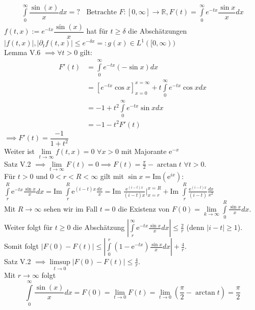  \begin{example}
    \begin{align*}
      \int\limits_0^{\infty} \dfrac{\sin(x)}{x} dx = ? \ \ \ \ \text{Betrachte $F: [0, \infty] \to \mathbb{R}, F(t) = \int\limits_0^{\infty} e^{-tx} \dfrac{\sin{x}}{x} dx$}
    \end{align*}
    $f(t,x) := e^{-tx} \dfrac{\sin(x)}{x}$ hat für $t \geq \delta$ die Abschätzungen\\
    $|f(t,x)|, |\partial_t f(t,x)| \leq e^{-\delta x} =: g(x) \in L^1([0, \infty))$\\
    Lemma V.6 $\implies \forall t > 0$ gilt: 
    \begin{align*}
      F'(t) &= \int\limits_0^{\infty} e^{-tx} (-\sin{x}) dx\\
            &= [e^{-tx} \cos{x}]_{x=0}^{x=\infty} + t \int\limits_0^{\infty} e^{-tx} \cos{x} dx\\
            &= -1 + t^2 \int\limits_0^{\infty} e^{-tx} \sin{x} dx\\
            &= -1 - t^2 F'(t)
    \end{align*}
    $\implies F'(t) = \dfrac{-1}{1+t^2}$\\
    Weiter ist $\lim\limits_{t\to\infty} f(t,x) = 0$ $\forall x>0$ mit Majorante $\text{e}^{-x}$  \\
    Satz V.2 $\implies \lim\limits_{t\to\infty} F(t) = 0 \implies F(t) = \frac{\pi}{2}-\arctan{t}$ $\forall t>0$. \\
    Für $t>0$ und $0<r<R<\infty$ gilt mit $\sin{x} = \text{Im}(\text{e}^{ix})$: \\
    $ \int\limits_r^R \text{e}^{-tx} \frac{\sin{x}}{x}dx = \text{Im}$ $\int\limits_r^R \text{e}^{(i-t)x}\frac{dx}{x} = \text{Im}$ $\frac{\text{e}^{(i-t)x}}{(i-t)x} |_{x=r}^{x=R} + \text{Im}$ $\int\limits_r^R \frac{\text{e}^{(i-t)x}}{(i-t)}\frac{dx}{x^2}$ \\
    Mit $R\to\infty$ sehen wir im Fall $t=0$ die Existenz von $F(0) = \lim\limits_{k\to\infty}\int\limits_0^R \frac{\sin{x}}{x}dx$. Weiter folgt für $t\geq 0$ die Abschätzung $\left| \int\limits_r^\infty \text{e}^{-tx} \frac{\sin{x}}{x}dx \right| \leq \frac{2}{r}$ (denn $|i-t|\geq 1$). Somit folgt $\left| F(0) - F(t) \right| \leq \left| \int\limits_0^r (1-\text{e}^{-tx}) \frac{\sin{x}}{x} dx \right| + \frac{4}{r}$. \\
    Satz V.2 $\implies \limsup\limits_{t\to 0} \left| F(0)-F(t)\right| \leq \frac{4}{r}$. \\
    Mit $r\to\infty$ folgt 
    $$\int\limits_0^{\infty} \dfrac{\sin(x)}{x} dx = F(0) = \lim\limits_{t\to 0}F(t) = \lim\limits_{t\to 0} \left( \dfrac{\pi}{2}-\arctan{t} \right) = \dfrac{\pi}{2}$$
  \end{example}

